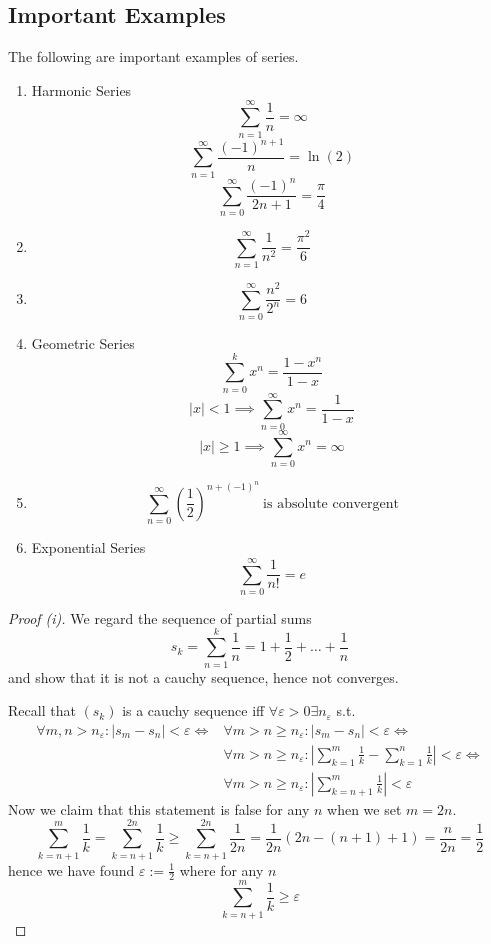 \subsection{Important Examples}
\begin{proposition}
   The following are important examples of series.
   \begin{enumerate}[label=\roman*, align=Center]
      \item Harmonic Series
         \[\sum_{n=1}^\infty \frac{1}{n} = \infty\]
         \[\sum_{n=1}^\infty \frac{(-1)^{n+1}}{n} = \ln(2)\]
         \[\sum_{n=0}^\infty \frac{(-1)^n}{2n+1} = \frac{\pi}{4}\]
      \item \[\sum_{n=1}^\infty \frac{1}{n^2} = \frac{\pi^2}{6}\]
      \item \[\sum_{n=0}^\infty \frac{n^2}{2^n} = 6\]
      \item Geometric Series
         \[\sum_{n=0}^k x^n = \frac{1-x^n}{1-x}\]
         \[|x| < 1 \implies \sum_{n = 0}^\infty x^n = \frac{1}{1 - x}\]
         \[|x| \geq 1 \implies \sum_{n = 0}^\infty x^n = \infty\]
      \item \[\sum_{n=0}^\infty \left(\frac{1}{2}\right)^{n+(-1)^n}~\text{is absolute convergent}\]
      \item Exponential Series
         \[\sum_{n=0}^\infty \frac{1}{n!} = e\]
   \end{enumerate}
\end{proposition}
\begin{proof}[Proof (i)]
   We regard the sequence of partial sums
   \[s_k = \sum_{n = 1}^k \frac{1}{n} = 1 + \frac{1}{2} + \ldots + \frac{1}{n}\]
   and show that it is not a cauchy sequence, hence not converges.

   Recall that \((s_k)\) is a cauchy sequence iff \(\forall \varepsilon > 0 \exists n_\varepsilon\) s.t.
   \begin{equation*}
      \begin{split}
         \forall m, n > n_\varepsilon: |s_m - s_n| < \varepsilon \iff & \forall m > n \geq n_\varepsilon: |s_m - s_n| < \varepsilon \iff \\
                                                                      & \forall m > n \geq n_\varepsilon: \left|\sum_{k=1}^m \frac{1}{k} - \sum_{k = 1}^n \frac{1}{k}\right| < \varepsilon \iff \\
                                                                      & \forall m > n \geq n_\varepsilon: \left|\sum_{k=n+1}^m \frac{1}{k}\right| < \varepsilon
      \end{split}
   \end{equation*}
   Now we claim that this statement is false for any \(n\) when we set \(m = 2n\).
   \[\sum_{k=n+1}^{m} \frac{1}{k} = \sum_{k=n+1}^{2n} \frac{1}{k} \geq \sum_{k=n+1}^{2n} \frac{1}{2n} = \frac{1}{2n} (2n - (n+1) + 1) = \frac{n}{2n} = \frac{1}{2}\]
   hence we have found \(\varepsilon := \frac{1}{2}\) where for any \(n\)
   \[\sum_{k=n+1}^{m} \frac{1}{k} \geq \varepsilon\]
\end{proof}
